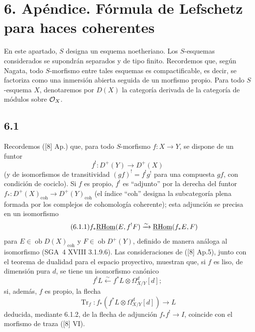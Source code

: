 \section*{6. Apéndice. Fórmula de Lefschetz para haces coherentes}

En este apartado, $S$ designa un esquema noetheriano. Los $S$-esquemas considerados se supondrán separados y de tipo finito. Recordemos que, según Nagata, todo $S$-morfismo entre tales esquemas es compactificable, es decir, se factoriza como una inmersión abierta seguida de un morfismo propio. Para todo $S$-esquema $X$, denotaremos por $D(X)$ la categoría derivada de la categoría de módulos sobre $\mathcal{O}_X$.

\subsection*{6.1}
Recordemos ([8] Ap.) que, para todo $S$-morfismo $f:X\to Y$, se dispone de un funtor
\[
f^!:D^+(Y)\longrightarrow D^+(X)
\]
(y de isomorfismos de transitividad $(gf)^! = f^!g^!$ para una compuesta $gf$, con condición de cociclo). Si $f$ es propio, $f^!$ es ``adjunto'' por la derecha del funtor $f_*:D^+(X)_{\mathrm{coh}}\to D^+(Y)_{\mathrm{coh}}$ (el índice ``coh'' designa la subcategoría plena formada por los complejos de cohomología coherente); esta adjunción se precisa en un isomorfismo
\begin{equation}
\tag{6.1.1}
f_*\underline{\mathrm{RHom}}(E,f^!F)\xrightarrow{\sim}\underline{\mathrm{RHom}}(f_*E,F)
\end{equation}
para $E\in\operatorname{ob}D(X)_{\mathrm{coh}}$ y $F\in\operatorname{ob}D^+(Y)$, definido de manera análoga al isomorfismo (SGA~4 XVIII 3.1.9.6). Las consideraciones de ([8] Ap.5), junto con el teorema de dualidad para el espacio proyectivo, muestran que, si $f$ es liso, de dimensión pura $d$, se tiene un isomorfismo canónico
\begin{equation}
\tag{6.1.2}
f^!L\xleftarrow{\sim} f^*L\otimes\Omega^d_{X/Y}[d];
\end{equation}
si, además, $f$ es propio, la flecha
\begin{equation}
\tag{6.1.3}
\operatorname{Tr}_f:f_*(f^*L\otimes\Omega^d_{X/Y}[d])\longrightarrow L
\end{equation}
deducida, mediante 6.1.2, de la flecha de adjunción $f_*f^!\to I$, coincide con el morfismo de traza ([8] VI).

